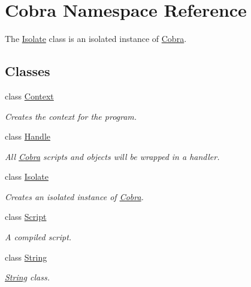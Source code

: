 \hypertarget{namespace_cobra}{\section{Cobra Namespace Reference}
\label{namespace_cobra}
}


The \hyperlink{class_cobra_1_1_isolate}{Isolate} class is an isolated instance of \hyperlink{namespace_cobra}{Cobra}.  


\subsection*{Classes}
\begin{DoxyCompactItemize}
\item 
class \hyperlink{class_cobra_1_1_context}{Context}
\begin{DoxyCompactList}\small\item\em Creates the context for the program. \end{DoxyCompactList}\item 
class \hyperlink{class_cobra_1_1_handle}{Handle}
\begin{DoxyCompactList}\small\item\em All \hyperlink{namespace_cobra}{Cobra} scripts and objects will be wrapped in a handler. \end{DoxyCompactList}\item 
class \hyperlink{class_cobra_1_1_isolate}{Isolate}
\begin{DoxyCompactList}\small\item\em Creates an isolated instance of \hyperlink{namespace_cobra}{Cobra}. \end{DoxyCompactList}\item 
class \hyperlink{class_cobra_1_1_script}{Script}
\begin{DoxyCompactList}\small\item\em A compiled script. \end{DoxyCompactList}\item 
class \hyperlink{class_cobra_1_1_string}{String}
\begin{DoxyCompactList}\small\item\em \hyperlink{class_cobra_1_1_string}{String} class. \end{DoxyCompactList}\end{DoxyCompactItemize}
